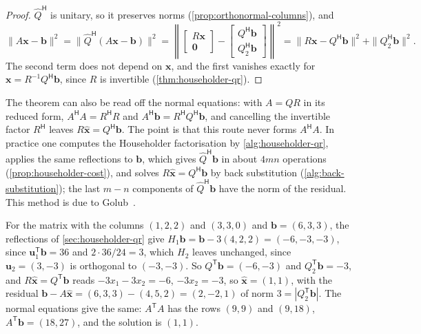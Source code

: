 \begin{proof}
$\hat Q^{\mathsf H}$ is unitary, so it preserves norms (\cref{prop:orthonormal-columns}), and
\[
\|A\mathbf x-\mathbf b\|^2=\bigl\|\hat Q^{\mathsf H}(A\mathbf x-\mathbf b)\bigr\|^2=\left\|\begin{bmatrix}R\mathbf x\\\mathbf 0\end{bmatrix}-\begin{bmatrix}Q^{\mathsf H}\mathbf b\\Q_2^{\mathsf H}\mathbf b\end{bmatrix}\right\|^2=\|R\mathbf x-Q^{\mathsf H}\mathbf b\|^2+\|Q_2^{\mathsf H}\mathbf b\|^2 .
\]
The second term does not depend on $\mathbf x$, and the first vanishes exactly for $\mathbf x=R^{-1}Q^{\mathsf H}\mathbf b$, since $R$ is invertible (\cref{thm:householder-qr}).
\end{proof}

The theorem can also be read off the normal equations: with $A=QR$ in its reduced form, $A^{\mathsf H}A=R^{\mathsf H}R$ and $A^{\mathsf H}\mathbf b=R^{\mathsf H}Q^{\mathsf H}\mathbf b$, and cancelling the invertible factor $R^{\mathsf H}$ leaves $R\hat{\mathbf x}=Q^{\mathsf H}\mathbf b$. The point is that this route never forms $A^{\mathsf H}A$. In practice one computes the Householder factorisation by \cref{alg:householder-qr}, applies the same reflections to $\mathbf b$, which gives $\hat Q^{\mathsf H}\mathbf b$ in about $4mn$ operations (\cref{prop:householder-cost}), and solves $R\hat{\mathbf x}=Q^{\mathsf H}\mathbf b$ by back substitution (\cref{alg:back-substitution}); the last $m-n$ components of $\hat Q^{\mathsf H}\mathbf b$ have the norm of the residual. This method is due to Golub~\cite{golub1965}.

For the matrix with the columns $(1,2,2)$ and $(3,3,0)$ and $\mathbf b=(6,3,3)$, the reflections of \cref{sec:householder-qr} give $H_1\mathbf b=\mathbf b-3(4,2,2)=(-6,-3,-3)$, since $\mathbf u_1^{\mathsf T}\mathbf b=36$ and $2\cdot36/24=3$, which $H_2$ leaves unchanged, since $\mathbf u_2=(3,-3)$ is orthogonal to $(-3,-3)$. So $Q^{\mathsf T}\mathbf b=(-6,-3)$ and $Q_2^{\mathsf T}\mathbf b=-3$, and $R\hat{\mathbf x}=Q^{\mathsf T}\mathbf b$ reads $-3x_1-3x_2=-6$, $-3x_2=-3$, so $\hat{\mathbf x}=(1,1)$, with the residual $\mathbf b-A\hat{\mathbf x}=(6,3,3)-(4,5,2)=(2,-2,1)$ of norm $3=|Q_2^{\mathsf T}\mathbf b|$. The normal equations give the same: $A^{\mathsf T}A$ has the rows $(9,9)$ and $(9,18)$, $A^{\mathsf T}\mathbf b=(18,27)$, and the solution is $(1,1)$.

